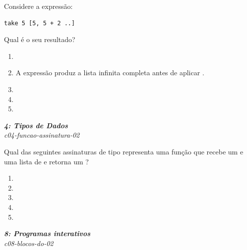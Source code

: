 \documentclass[a4paper,10pt,brazil]{article}
\begin{document}
\begin{multicols}{2}
\begin{flushright}
\end{flushright}
Considere a expressão:
\begin{verbatim}
take 5 [5, 5 + 2 ..]
\end{verbatim}
Qual é o seu resultado?

\begin{enumerate}
  \item \haskellinline{ [5,10,15,20,25] }

  \item A expressão produz a lista infinita completa antes de aplicar .

  \item \haskellinline{ [5,7,9,11,13] }

  \item \haskellinline{ [7,9,11,13,15] }

  \item \haskellinline{ [5,7,9,11] }


\end{enumerate}

\begin{flushright}
  \footnotesize
  \textit{\textbf{4: Tipos de Dados}}\\
  \textit{c04-funcao-assinatura-02}\\

\end{flushright}
Qual das seguintes assinaturas de tipo representa uma função que recebe um  e uma lista de  e retorna um ?

\begin{enumerate}
  \item {}

  \item {}

  \item {}

  \item {}

  \item {}


\end{enumerate}

\begin{flushright}
  \footnotesize
  \textit{\textbf{8: Programas interativos}}\\
  \textit{c08-blocos-do-02}\\


\end{flushright}
\end{multicols}
\end{document}
